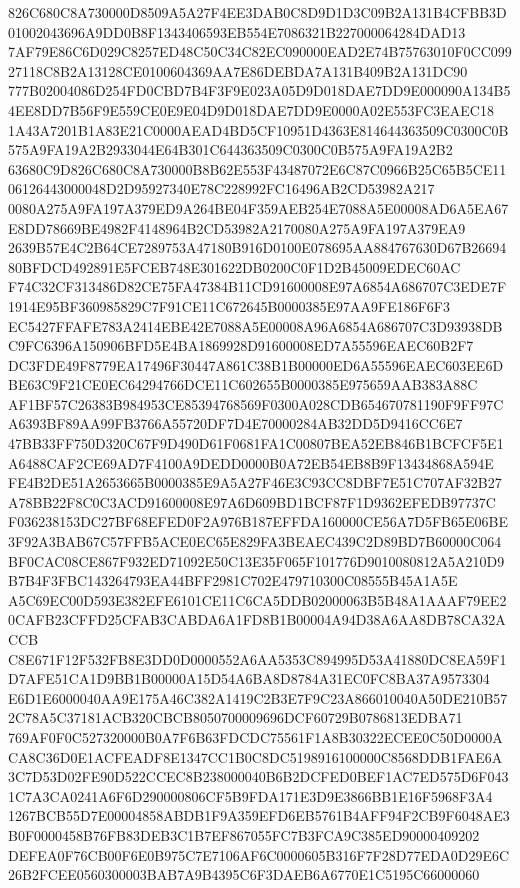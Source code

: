 \documentclass[UTF8,fontset=fandol,zihao=-4,a4paper]{ctexart}
\begin{document}
{{826C680C8A730000D8509A5A27F4EE3DAB0C8D9D1D3C09B2A131B4CFBB3D01002043696A9DD0B8F1343406593EB554E7086321B227000064284DAD13
7AF79E86C6D029C8257ED48C50C34C82EC090000EAD2E74B75763010F0CC09927118C8B2A13128CE0100604369AA7E86DEBDA7A131B409B2A131DC90
777B02004086D254FD0CBD7B4F3F9E023A05D9D018DAE7DD9E000090A134B54EE8DD7B56F9E559CE0E9E04D9D018DAE7DD9E0000A02E553FC3EAEC18
1A43A7201B1A83E21C0000AEAD4BD5CF10951D4363E814644363509C0300C0B575A9FA19A2B2933044E64B301C644363509C0300C0B575A9FA19A2B2
63680C9D826C680C8A730000B8B62E553F43487072E6C87C0966B25C65B5CE1106126443000048D2D95927340E78C228992FC16496AB2CD53982A217
0080A275A9FA197A379ED9A264BE04F359AEB254E7088A5E00008AD6A5EA67E8DD78669BE4982F4148964B2CD53982A2170080A275A9FA197A379EA9
2639B57E4C2B64CE7289753A47180B916D0100E078695AA884767630D67B2669480BFDCD492891E5FCEB748E301622DB0200C0F1D2B45009EDEC60AC
F74C32CF313486D82CE75FA47384B11CD91600008E97A6854A686707C3EDE7F1914E95BF360985829C7F91CE11C672645B0000385E97AA9FE186F6F3
EC5427FFAFE783A2414EBE42E7088A5E00008A96A6854A686707C3D93938DBC9FC6396A150906BFD5E4BA1869928D91600008ED7A55596EAEC60B2F7
DC3FDE49F8779EA17496F30447A861C38B1B00000ED6A55596EAEC603EE6DBE63C9F21CE0EC64294766DCE11C602655B0000385E975659AAB383A88C
AF1BF57C26383B984953CE85394768569F0300A028CDB654670781190F9FF97CA6393BF89AA99FB3766A55720DF7D4E70000284AB32DD5D9416CC6E7
47BB33FF750D320C67F9D490D61F0681FA1C00807BEA52EB846B1BCFCF5E1A6488CAF2CE69AD7F4100A9DEDD0000B0A72EB54EB8B9F13434868A594E
FE4B2DE51A2653665B0000385E9A5A27F46E3C93CC8DBF7E51C707AF32B27A78BB22F8C0C3ACD91600008E97A6D609BD1BCF87F1D9362EFEDB97737C
F036238153DC27BF68EFED0F2A976B187EFFDA160000CE56A7D5FB65E06BE3F92A3BAB67C57FFB5ACE0EC65E829FA3BEAEC439C2D89BD7B60000C064
BF0CAC08CE867F932ED71092E50C13E35F065F101776D9010080812A5A210D9B7B4F3FBC143264793EA44BFF2981C702E479710300C08555B45A1A5E
A5C69EC00D593E382EFE6101CE11C6CA5DDB02000063B5B48A1AAAF79EE20CAFB23CFFD25CFAB3CABDA6A1FD8B1B00004A94D38A6AA8DB78CA32ACCB
C8E671F12F532FB8E3DD0D0000552A6AA5353C894995D53A41880DC8EA59F1D7AFE51CA1D9BB1B00000A15D54A6BA8D8784A31EC0FC8BA37A9573304
E6D1E6000040AA9E175A46C382A1419C2B3E7F9C23A866010040A50DE210B572C78A5C37181ACB320CBCB8050700009696DCF60729B0786813EDBA71
769AF0F0C527320000B0A7F6B63FDCDC75561F1A8B30322ECEE0C50D0000ACA8C36D0E1ACFEADF8E1347CC1B0C8DC5198916100000C8568DDB1FAE6A
3C7D53D02FE90D522CCEC8B238000040B6B2DCFED0BEF1AC7ED575D6F0431C7A3CA0241A6F6D290000806CF5B9FDA171E3D9E3866BB1E16F5968F3A4
1267BCB55D7E00004858ABDB1F9A359EFD6EB5761B4AFF94F2CB9F6048AE3B0F0000458B76FB83DEB3C1B7EF867055FC7B3FCA9C385ED90000409202
DEFEA0F76CB00F6E0B975C7E7106AF6C0000605B316F7F28D77EDA0D29E6C26B2FCEE0560300003BAB7A9B4395C6F3DAEB6A6770E1C5195C66000060
}}
\end{document}

